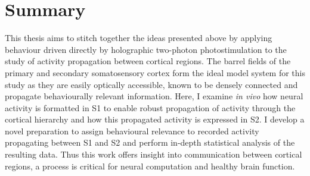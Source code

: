 \section{Summary}

This thesis aims to stitch together the ideas presented above by applying behaviour driven directly by holographic two-photon photostimulation to the study of activity propagation between cortical regions. The barrel fields of the primary and secondary somatosensory cortex form the ideal model system for this study as they are easily optically accessible, known to be densely connected and propagate behaviourally relevant information. Here, I examine \textit{in vivo} how neural activity is formatted in S1 to enable robust propagation of activity through the cortical hierarchy and how this propagated activity is expressed in S2. I develop a novel preparation to assign behavioural relevance to recorded activity propagating between S1 and S2 and perform in-depth statistical analysis of the resulting data. Thus this work offers insight into communication between cortical regions, a process is critical for neural computation and healthy brain function.